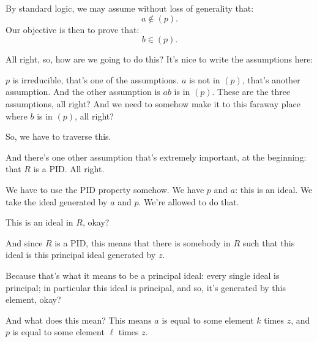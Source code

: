 \begin{proofWrapper}
\begin{content}
By standard logic, we may assume without loss of generality that:
\begin{equation}\label{eq:part3-a-not-in-p}
a \notin (p).
\end{equation}
Our objective is then to prove that:
\begin{equation}\label{eq:part3-goal-b-in-p}
b \in (p).
\end{equation}
\end{content}

\begin{speech}[00:48:42 - 00:50:42]
All right, so, how are we going to do this? It's nice to write the assumptions here: 

$p$ is irreducible, that's one of the assumptions. $a$ is not in $(p)$, that's another assumption. And the other assumption is $ab$ is in $(p)$. These are the three assumptions, all right? And we need to somehow make it to this faraway place where $b$ is in $(p)$, all right? 

So, we have to traverse this.

And there's one other assumption that's extremely important, at the beginning: that $R$ is a PID.  All right.

We have to use the PID property somehow. We have $p$ and $a$: this is an ideal. We take the ideal generated by $a$ and $p$.  We're allowed to do that.

This is an ideal in $R$, okay?

And since $R$ is a PID,  this means that there is somebody in $R$  such that this ideal is this principal ideal generated by $z$. 

Because that's what it means to be a principal ideal: every single ideal is principal; in particular this ideal is principal, and so, it's generated by this element, okay?

And what does this mean? This means $a$ is equal to some element $k$ times $z$, and $p$ is equal to some element $\ell$ times $z$. 
\end{speech}

\begin{hidden}
\end{hidden}


\end{proofWrapper}
